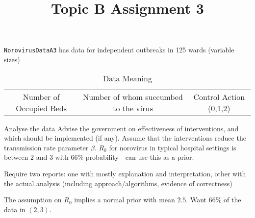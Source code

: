 \documentclass{X:/Documents/Coding/Latex/myassignment}
\title{Topic B Assignment 3}
\begin{document}
\maketitle

\verb|NorovirusDataA3| has data for independent outbreaks in 125 wards (variable sizes)

\begin{table}[tb]
	\caption{Data Meaning}
	\label{tab:dataexplained}
	\centering
\begin{tabular}{c|c|c}
Number of Occupied Beds &Number of whom succumbed to the virus & Control Action (0,1,2)
\end{tabular}
\end{table}



Analyse the data
Advise the government on effectiveness of interventions, and which should be implemented (if any). 
Assume that the interventions reduce the transmission rate parameter $\beta$. 
$R_0$ for norovirus in typical hospital settings is between $2$ and $3$ with $66\%$ probability - can use this as a prior.

Require two reports: one with mostly explanation and interpretation, other with the actual analysis (including approach/algorithms, evidence of correctness)




The assumption on $R_0$ implies a normal prior with mean $2.5$. Want $66\%$ of the data in $(2,3)$.
\end{document}
